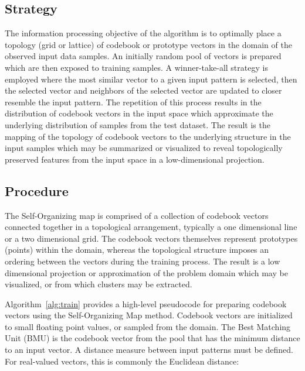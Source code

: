 \subsection{Strategy}
The information processing objective of the algorithm is to optimally place a topology (grid or lattice) of codebook or prototype vectors in the domain of the observed input data samples.
An initially random pool of vectors is prepared which are then exposed to training samples. A winner-take-all strategy is employed where the most similar vector to a given input pattern is selected, then the selected vector and neighbors of the selected vector are updated to closer resemble the input pattern. The repetition of this process results in the distribution of codebook vectors in the input space which approximate the underlying distribution of samples from the test dataset. The result is the mapping of the topology of codebook vectors to the underlying structure in the input samples which may be summarized or visualized to reveal topologically preserved features from the input space in a low-dimensional projection.

\subsection{Procedure}
The Self-Organizing map is comprised of a collection of codebook vectors connected together in a topological arrangement, typically a one dimensional line or a two dimensional grid. The codebook vectors themselves represent prototypes (points) within the domain, whereas the topological structure imposes an ordering between the vectors during the training process. The result is a low dimensional projection or approximation of the problem domain which may be visualized, or from which clusters may be extracted.

Algorithm~\ref{alg:train} provides a high-level pseudocode for preparing codebook vectors using the Self-Organizing Map method. 
Codebook vectors are initialized to small floating point values, or sampled from the domain. The Best Matching Unit (BMU) is the codebook vector from the pool that has the minimum distance to an input vector. A distance measure between input patterns must be defined. For real-valued vectors, this is commonly the Euclidean distance:

